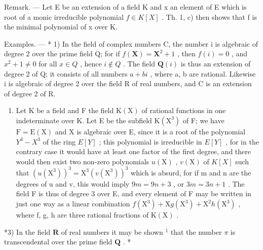 Remark. --- Let E be an extension of a field K and x an element of E which is root of a monic irreducible polynomial \(f \in K[X]\) . Th. 1, c) then shows that f is the minimal polynomial of x over K.

Examples. --- * 1) In the field of complex numbers C, the number i is algebraic of degree 2 over the prime field Q; for if \(f(\mathbf{X}) = \mathbf{X}^{2} + 1\) , then \(f(i) = 0\) , and \(x^{2} + 1 \neq 0\) for all \(x \in Q\) , hence \(i \notin Q\) . The field \(\mathbf{Q}(i)\) is thus an extension of degree 2 of Q; it consists of all numbers \(a + bi\) , where a, b are rational. Likewise i is algebraic of degree 2 over the field R of real numbers, and C is an extension of degree 2 of R.

\begin{enumerate}
\def\labelenumi{\arabic{enumi})}
\setcounter{enumi}{1}
\tightlist
\item
  Let K be a field and F the field \(\mathrm{K}(\mathrm{X})\) of rational functions in one indeterminate over K. Let E be the subfield \(\mathrm{K}(\mathrm{X}^{3})\) of F; we have \(\mathrm{F} = \mathrm{E}(\mathrm{X})\) and X is algebraic over E, since it is a root of the polynomial \(Y^{3} - X^{3}\) of the ring \(E[Y]\) ; this polynomial is irreducible in \(E[Y]\) , for in the contrary case it would have at least one factor of the first degree, and there would then exist two non-zero polynomials \(u(\mathrm{X})\) , \(v(\mathrm{X})\) of \(K[X]\) such that \((u(\mathrm{X}^{3}))^{3} = \mathrm{X}^{3}(v(\mathrm{X}^{3}))^{3}\) which is absurd, for if m and n are the degrees of u and v, this would imply \(9m = 9n + 3\) , or \(3m = 3n + 1\) . The field F is thus of degree 3 over E, and every element of F may be written in just one way as a linear combination \(f(\mathrm{X}^{3}) + \mathrm{X}g(\mathrm{X}^{3}) + \mathrm{X}^{2}h(\mathrm{X}^{3})\) , where f, g, h are three rational fractions of \(\mathrm{K}(\mathrm{X})\) .
\end{enumerate}

*3) In the field \(\mathbf{R}\) of real numbers it may be shown \(^1\) that the number \(\pi\) is transcendental over the prime field \(\mathbf{Q}\) . *

